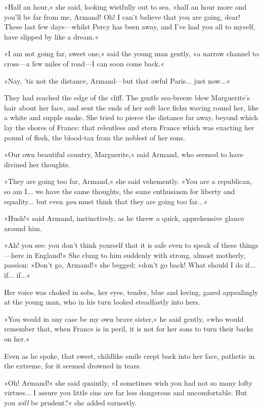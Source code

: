 »Half an hour,« she said, looking wistfully out to sea, »half an hour more and you'll be far from me, Armand! Oh! I can't believe that you are going, dear! These last few days\allowbreak---\allowbreak whilst Percy has been away, and I've had you all to myself, have slipped by like a dream.«

»I am not going far, sweet one,« said the young man gently, »a narrow channel to cross\allowbreak---\allowbreak a few miles of road\allowbreak---\allowbreak I can soon come back.«

»Nay, 'tis not the distance, Armand\allowbreak---\allowbreak but that awful Paris... just now...«

They had reached the edge of the cliff. The gentle sea-breeze blew Marguerite's hair about her face, and sent the ends of her soft lace fichu waving round her, like a white and supple snake. She tried to pierce the distance far away, beyond which lay the shores of France: that relentless and stern France which was exacting her pound of flesh, the blood-tax from the noblest of her sons.

»Our own beautiful country, Marguerite,« said Armand, who seemed to have divined her thoughts.

»They are going too far, Armand,« she said vehemently. »You are a republican, so am I... we have the same thoughts, the same enthusiasm for liberty and equality... but even \textit{you} must think that they are going too far...«

»Hush!\longdash« said Armand, instinctively, as he threw a quick, apprehensive glance around him.

»Ah! you see: you don't think yourself that it is safe even to speak of these things\allowbreak---\allowbreak here in England!« She clung to him suddenly with strong, almost motherly, passion: »Don't go, Armand!« she begged; »don't go back! What should I do if... if... if...«

Her voice was choked in sobs, her eyes, tender, blue and loving, gazed appealingly at the young man, who in his turn looked steadfastly into hers.

»You would in any case be my own brave sister,« he said gently, »who would remember that, when France is in peril, it is not for her sons to turn their backs on her.«

Even as he spoke, that sweet, childlike smile crept back into her face, pathetic in the extreme, for it seemed drowned in tears.

»Oh! Armand!« she said quaintly, »I sometimes wish you had not so many lofty virtues... I assure you little sins are far less dangerous and uncomfortable. But you \textit{will} be prudent?« she added earnestly.

